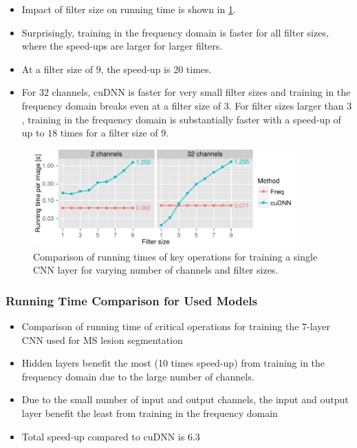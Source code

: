 \begin{itemize}
\item Impact of filter size on running time is shown in \ref{fig:filtersize}.
\item Surprisingly, training in the frequency domain is faster for all filter
sizes, where the speed-ups are larger for larger filters.
\item At a filter size of $9$, the speed-up is 20 times.
\item For $32$ channels, cuDNN is faster for very small filter sizes and
training in the frequency domain breaks even at a filter size of $3$. For filter sizes
larger than $3$, training in the frequency domain is substantially faster with a
speed-up of up to $18$ times for a filter size of $9$.
\end{itemize}

\begin{figure}
\centering
\includegraphics[width=0.9\textwidth]{figures/filtersize}
\caption[Comparison of running times of key operations for training a single
CNN layer.]{Comparison of running times of key operations for training a single
CNN layer for varying number of channels and filter sizes.}
\label{fig:filtersize}
\end{figure}

\subsubsection{Running Time Comparison for Used Models}

\begin{itemize}
\item Comparison of running time of critical operations for training the
$7$-layer CNN used for MS lesion segmentation
\item Hidden layers benefit the most (10 times speed-up) from training in the
frequency domain due to the large number of channels.
\item Due to the small number of input and output channels, the input and output
layer benefit the least from training in the frequency domain
\item Total speed-up compared to cuDNN is 6.3
\end{itemize}

